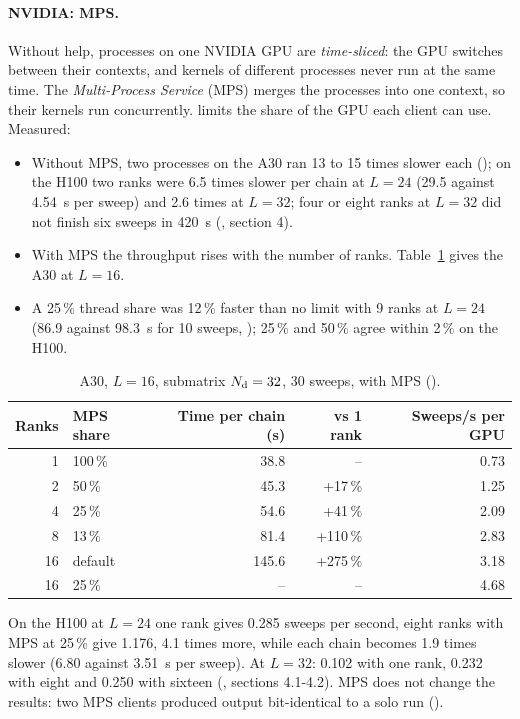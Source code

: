 \paragraph{NVIDIA: MPS.} Without help, processes on one NVIDIA GPU are \emph{time-sliced}: the GPU switches between their contexts, and kernels of different processes never run at the same time. The \emph{Multi-Process Service} (MPS) merges the processes into one context, so their kernels run concurrently.  limits the share of the GPU each client can use. Measured:
\begin{itemize}
\item Without MPS, two processes on the A30 ran 13 to 15 times slower each (); on the H100 two ranks were 6.5 times slower per chain at $L=24$ (29.5 against 4.54~s per sweep) and 2.6 times at $L=32$; four or eight ranks at $L=32$ did not finish six sweeps in 420~s (, section 4). %
\item With MPS the throughput rises with the number of ranks. Table~\ref{tab:mps} gives the A30 at $L=16$.
\item A 25\,\% thread share was 12\,\% faster than no limit with 9 ranks at $L=24$ (86.9 against 98.3~s for 10 sweeps, ); 25\,\% and 50\,\% agree within 2\,\% on the H100. %
\end{itemize}

\begin{table}[h]
\centering\small
\caption{A30, $L=16$, submatrix $N_{\rm d}=32$, 30 sweeps, with MPS ().}
\label{tab:mps}
\begin{tabular}{@{}rlrrr@{}}
\toprule
Ranks & MPS share & Time per chain (s) & vs 1 rank & Sweeps/s per GPU \\
\midrule
1 & 100\,\% & 38.8 & -- & 0.73 \\ %
2 & 50\,\% & 45.3 & +17\,\% & 1.25 \\
4 & 25\,\% & 54.6 & +41\,\% & 2.09 \\
8 & 13\,\% & 81.4 & +110\,\% & 2.83 \\
16 & default & 145.6 & +275\,\% & 3.18 \\
16 & 25\,\% & -- & -- & 4.68 \\
\bottomrule
\end{tabular}
\end{table}

On the H100 at $L=24$ one rank gives 0.285 sweeps per second, eight ranks with MPS at 25\,\% give 1.176, 4.1 times more, while each chain becomes 1.9 times slower (6.80 against 3.51~s per sweep). At $L=32$: 0.102 with one rank, 0.232 with eight and 0.250 with sixteen (, sections 4.1-4.2). %
MPS does not change the results: two MPS clients produced output bit-identical to a solo run ().

